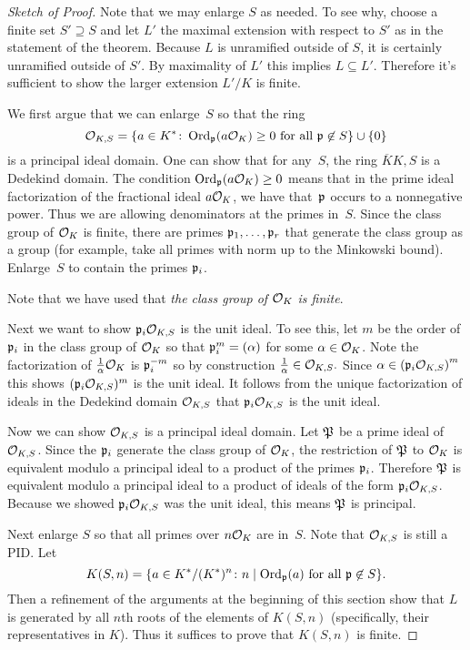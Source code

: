 \begin{proof}[Sketch of Proof]
  Note that we may enlarge $S$ as needed. To see why,
  choose a finite set $S' \supseteq S$ and let $L'$ the
  maximal extension with respect to $S'$ as in the
  statement of the theorem. Because $L$ is unramified
  outside of $S$, it is certainly unramified outside of
  $S'$. By maximality of $L'$ this implies $L \subseteq L'$.
  Therefore it's sufficient to show the larger extension
  $L'/K$ is finite.

  We first argue that we can enlarge~$S$ so that the ring
  \[
    \sO_{K,S} =
    \{ a \in K^* \colon \Ord_\p(a\sO_K) \geq 0 \text{ for all } \p\not\in S \}
    \cup \{0\}
  \]
  is a principal ideal domain.
  One can show that for any~$S$, the ring $\overline{K}{K,S}$ is a Dedekind domain.
  The condition $ \Ord_\p(a\sO_K) \geq 0$
  means that in the prime ideal factorization of the fractional ideal
  $a\sO_K$, we have that~$\p$ occurs to a nonnegative power. Thus we are
  allowing denominators at the primes in~$S$. Since the class group of
  $\sO_K$ is finite, there are primes $\p_1,\ldots, \p_r$ that generate
  the class group as a group (for example, take all primes with norm up to
  the Minkowski bound). Enlarge~$S$ to contain the primes $\p_i$.

  Note that we have used that \emph{the class group of $\sO_K$ is finite}.

  Next we want to show $\p_i\sO_{K,S}$ is the unit ideal. To see this,
  let $m$ be the order of $\p_i$ in the class group of $\sO_{K}$ so that
  $\p_i^m = (\alpha)$ for some $\alpha\in \sO_{K}$. Note the factorization
  of $\frac{1}{\alpha}\sO_{K}$ is $\p_i^{-m}$ so by construction
  $\frac{1}{\alpha}\in\sO_{K,S}.$ Since
  $\alpha\in \left(\p_i\sO_{K,S}\right)^m$ this shows $(\p_i\sO_{K,S})^m$
  is the unit ideal. It follows from the unique factorization of ideals
  in the Dedekind domain $\sO_{K,S}$ that $\p_i\sO_{K,S}$ is the unit ideal.

  Now we can show $\sO_{K,S}$ is a principal ideal domain. Let $\P$
  be a prime ideal of $\sO_{K,S}$. Since the $\p_i$ generate
  the class group of $\sO_K$, the restriction of $\P$ to $\sO_K$ is
  equivalent modulo a principal ideal to a product of the primes
  $\p_i$. Therefore $\P$ is equivalent modulo a principal ideal
  to a product of ideals of the form $\p_i\sO_{K,S}$. Because we showed
  $\p_i\sO_{K,S}$ was the unit ideal, this means $\P$ is principal.

  Next enlarge $S$ so that all primes over $n\sO_K$ are in~$S$.
  Note that $\sO_{K,S}$ is still a PID.  Let
  \[
    K(S,n) =
    \{ a \in K^*/(K^*)^n \colon n \mid \Ord_\p(a) \text{ for all } \p \not\in S \}.
  \]
  Then a refinement of the arguments at the beginning of
  this section show that $L$ is generated by all $n$th roots
  of the elements of $K(S,n)$ (specifically, their representatives in $K$).
  Thus it suffices to prove that $K(S,n)$ is finite.


\end{proof}
